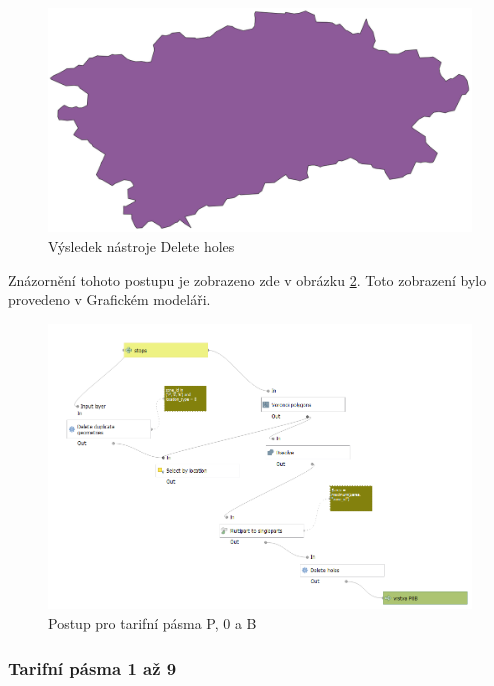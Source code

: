 \begin{figure}[H] \centering
    \includegraphics[width=400pt]{./pictures/without-holes-P0B.png}
    \caption[Výsledek nástroje Delete holes]{Výsledek nástroje Delete holes}
	\label{fig:without-holes-P0B}              
\end{figure} 

Znázornění tohoto postupu je zobrazeno zde v obrázku \ref{fig:postup-voronoi-P0B}. Toto zobrazení bylo provedeno v Grafickém modeláři.

\begin{figure}[H] \centering
    \includegraphics[width=400pt]{./pictures/postup-voronoi-P0B.png}
    \caption[Postup pro tarifní pásma P, 0 a B]{Postup pro tarifní pásma P, 0 a B}
	\label{fig:postup-voronoi-P0B}              
\end{figure}

\subsubsection{Tarifní pásma 1 až 9}
\label{tp_1az9}

